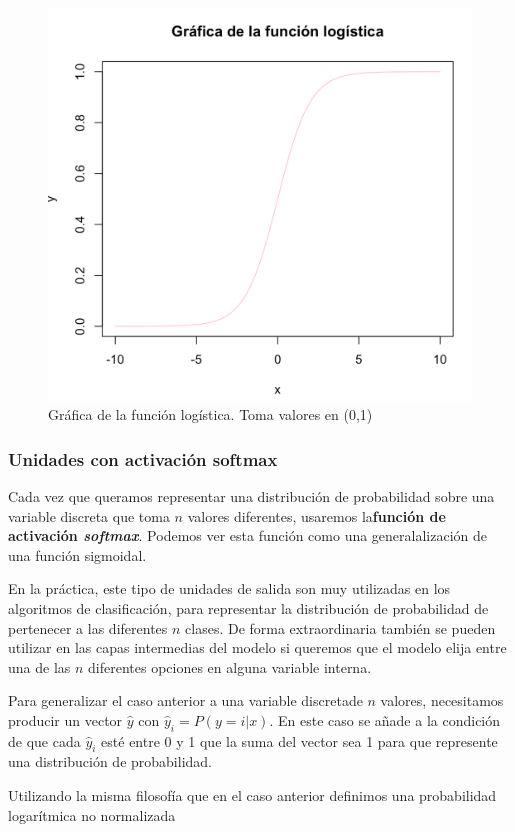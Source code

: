  		\begin{figure}[h!]
 			\centering
 			\includegraphics[width=0.7\linewidth]{imagenes/log}
 			\caption{Gráfica de la función logística. Toma valores en (0,1)}
 			\label{fig:log}
 		\end{figure}
 		 
		
	\subsubsection{Unidades con activación softmax}
		
		Cada vez que queramos representar una distribución de probabilidad sobre una variable discreta que toma $n$ valores diferentes, usaremos la\textbf{función de activación \textit{softmax}}. Podemos ver esta función como una generalalización de una función sigmoidal.
		
		En la práctica, este tipo de unidades de salida son muy utilizadas en los algoritmos de clasificación, para representar la distribución de probabilidad de pertenecer a las diferentes $n$ clases. De forma extraordinaria también se pueden utilizar en las capas intermedias del modelo si queremos que el modelo elija entre una de las $n$ diferentes opciones en alguna variable interna.
		
		Para generalizar el caso anterior a una variable discretade $n$ valores, necesitamos producir un vector $\hat{y}$ con $\hat{y}_i=P(y=i|x)$. En este caso se añade a la condición de que cada $\hat{y}_i$ esté entre 0 y 1 que la suma del vector sea 1 para que represente una distribución de probabilidad. 
		
		Utilizando la misma filosofía que en el caso anterior definimos una probabilidad logarítmica no normalizada
		

